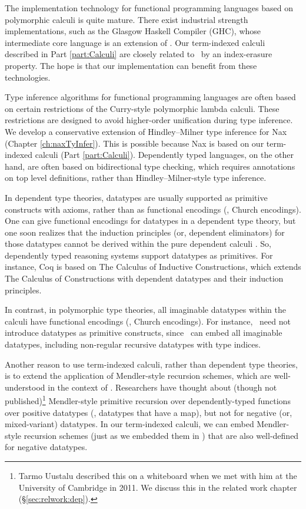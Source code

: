 The implementation technology for functional programming languages based on
polymorphic calculi is quite mature. There exist industrial
strength implementations, such as the Glasgow Haskell Compiler (GHC),
whose intermediate core language is an extension of \Fw.
Our term-indexed calculi described in Part \ref{part:Calculi} are closely
related to \Fw\ by an index-erasure property. The hope is that
our implementation can benefit from these technologies.

Type inference algorithms for functional programming languages are often
based on certain restrictions of the Curry-style polymorphic lambda calculi.
These restrictions are designed to avoid higher-order unification during
type inference.
We develop a conservative extension of Hindley--Milner type inference for
Nax (Chapter \ref{ch:naxTyInfer}). This is possible because Nax is based on our
term-indexed calculi (Part \ref{part:Calculi}). Dependently typed languages,
on the other hand, are often based on bidirectional type checking, which
requires annotations on top level definitions, rather than
Hindley--Milner-style type inference.

In dependent type theories, datatypes are usually supported as primitive
constructs with axioms, rather than as functional encodings
(\eg, Church encodings). One can give functional encodings for datatypes
in a dependent type theory, but one soon realizes that the induction principles
(or, dependent eliminators) for those datatypes cannot be derived within
the pure dependent calculi \cite{Geuvers01}.
So, dependently typed reasoning systems support datatypes as primitives.
For instance, Coq is based on The Calculus of Inductive Constructions, which
extends The Calculus of Constructions \cite{CoqHue86} with dependent datatypes
and their induction principles.

In contrast, in polymorphic type theories, all imaginable datatypes
within the calculi have functional encodings (\eg, Church encodings).
For instance, \Fw\ need not introduce datatypes as primitive constructs,
since \Fw\ can embed all imaginable datatypes, including non-regular
recursive datatypes with type indices. 

Another reason to use term-indexed calculi, rather than dependent type theories,
is to extend the application of Mendler-style recursion schemes,
which are well-understood in the context of \Fw.
Researchers have thought about (though not published)\footnote{
     Tarmo Uustalu described this on a whiteboard
     when we met with him at the University of Cambridge in 2011.
     We discuss this in the related work chapter (\S\ref{sec:relwork:dep}).}
Mendler-style primitive recursion over dependently-typed functions
over positive datatypes (\ie, datatypes that have a map), but not for
negative (or, mixed-variant) datatypes. In our term-indexed calculi,
we can embed Mendler-style recursion schemes (just as we embedded them in \Fw)
that are also well-defined for negative datatypes.

